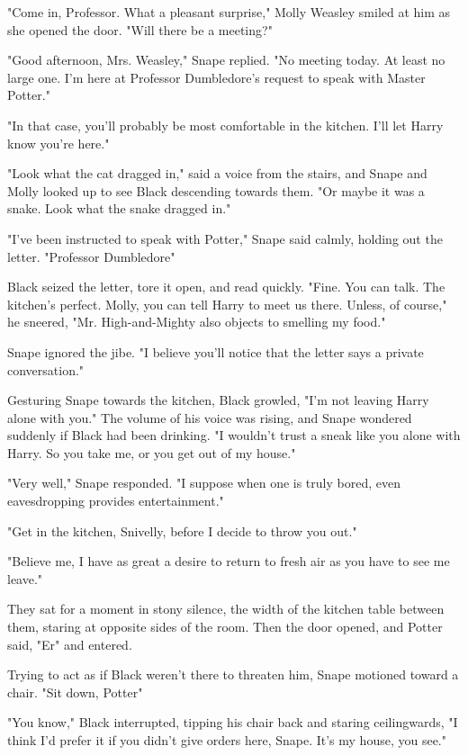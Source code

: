 "Come in, Professor. What a pleasant surprise," Molly Weasley smiled at him as she opened the door. "Will there be a meeting?"

"Good afternoon, Mrs. Weasley," Snape replied. "No meeting today. At least no large one. I'm here at Professor Dumbledore's request to speak with Master Potter."

"In that case, you'll probably be most comfortable in the kitchen. I'll let Harry know you're here."

"Look what the cat dragged in," said a voice from the stairs, and Snape and Molly looked up to see Black descending towards them. "Or maybe it was a snake. Look what the snake dragged in."

"I've been instructed to speak with Potter," Snape said calmly, holding out the letter. "Professor Dumbledore{\el}"

Black seized the letter, tore it open, and read quickly. "Fine. You can talk. The kitchen's perfect. Molly, you can tell Harry to meet us there. Unless, of course," he sneered, "Mr. High-and-Mighty also objects to smelling my food."

Snape ignored the jibe. "I believe you'll notice that the letter says a private conversation."

Gesturing Snape towards the kitchen, Black growled, "I'm not leaving Harry alone with you." The volume of his voice was rising, and Snape wondered suddenly if Black had been drinking. "I wouldn't trust a sneak like you alone with Harry. So you take me, or you get out of my house."

"Very well," Snape responded. "I suppose when one is truly bored, even eavesdropping provides entertainment."

"Get in the kitchen, Snivelly, before I decide to throw you out."

"Believe me, I have as great a desire to return to fresh air as you have to see me leave."

They sat for a moment in stony silence, the width of the kitchen table between them, staring at opposite sides of the room. Then the door opened, and Potter said, "Er{\el}" and entered.

Trying to act as if Black weren't there to threaten him, Snape motioned toward a chair. "Sit down, Potter{\el}"

"You know," Black interrupted, tipping his chair back and staring ceilingwards, "I think I'd prefer it if you didn't give orders here, Snape. It's my house, you see."

